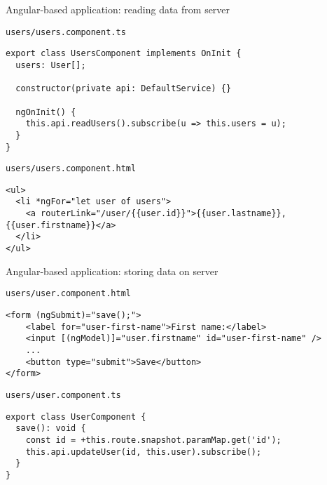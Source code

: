 \begin{frame}[fragile]{Angular-based application: reading data from server}
    \begin{block}{\texttt{users/users.component.ts}}
\begin{lstlisting}[style=mini]
export class UsersComponent implements OnInit {
  users: User[];

  constructor(private api: DefaultService) {}

  ngOnInit() {
    this.api.readUsers().subscribe(u => this.users = u);
  }
}
\end{lstlisting}
    \end{block}
    
    \begin{block}{\texttt{users/users.component.html}}
\begin{lstlisting}[style=mini]
<ul>
  <li *ngFor="let user of users">
    <a routerLink="/user/{{user.id}}">{{user.lastname}}, {{user.firstname}}</a>
  </li>
</ul>
\end{lstlisting}
    \end{block}
\end{frame}


\begin{frame}[fragile]{Angular-based application: storing data on server}
    \begin{block}{\texttt{users/user.component.html}}
\begin{lstlisting}[style=mini]
<form (ngSubmit)="save();">
    <label for="user-first-name">First name:</label>
    <input [(ngModel)]="user.firstname" id="user-first-name" />
    ...
    <button type="submit">Save</button>
</form>
\end{lstlisting}
    \end{block}
    
    \begin{block}{\texttt{users/user.component.ts}}
\begin{lstlisting}[style=mini]
export class UserComponent {
  save(): void {
    const id = +this.route.snapshot.paramMap.get('id');
    this.api.updateUser(id, this.user).subscribe();
  }
}
\end{lstlisting}
    \end{block}
\end{frame}




